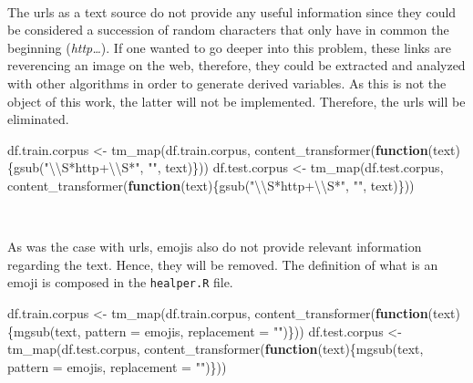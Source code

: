 \documentclass[
]{article}
\newenvironment{Shaded}{\begin{snugshade}}{\end{snugshade}}
\newcommand{\AttributeTok}[1]{\textcolor[rgb]{0.77,0.63,0.00}{#1}}
\newcommand{\ControlFlowTok}[1]{\textcolor[rgb]{0.13,0.29,0.53}{\textbf{#1}}}
\newcommand{\FunctionTok}[1]{\textcolor[rgb]{0.00,0.00,0.00}{#1}}
\newcommand{\NormalTok}[1]{#1}
\newcommand{\OtherTok}[1]{\textcolor[rgb]{0.56,0.35,0.01}{#1}}
\newcommand{\SpecialCharTok}[1]{\textcolor[rgb]{0.00,0.00,0.00}{#1}}
\newcommand{\StringTok}[1]{\textcolor[rgb]{0.31,0.60,0.02}{#1}}
\begin{document}
~

The urls as a text source do not provide any useful information since
they could be considered a succession of random characters that only
have in common the beginning (\emph{http\ldots{}}). If one wanted to go
deeper into this problem, these links are reverencing an image on the
web, therefore, they could be extracted and analyzed with other
algorithms in order to generate derived variables. As this is not the
object of this work, the latter will not be implemented. Therefore, the
urls will be eliminated.

\begin{Shaded}
\begin{Highlighting}[]
\NormalTok{df.train.corpus }\OtherTok{\textless{}{-}} \FunctionTok{tm\_map}\NormalTok{(df.train.corpus, }\FunctionTok{content\_transformer}\NormalTok{(}\ControlFlowTok{function}\NormalTok{(text)\{}\FunctionTok{gsub}\NormalTok{(}\StringTok{"}\SpecialCharTok{\textbackslash{}\textbackslash{}}\StringTok{S*http+}\SpecialCharTok{\textbackslash{}\textbackslash{}}\StringTok{S*"}\NormalTok{, }\StringTok{""}\NormalTok{, text)\}))}
\NormalTok{df.test.corpus }\OtherTok{\textless{}{-}} \FunctionTok{tm\_map}\NormalTok{(df.test.corpus, }\FunctionTok{content\_transformer}\NormalTok{(}\ControlFlowTok{function}\NormalTok{(text)\{}\FunctionTok{gsub}\NormalTok{(}\StringTok{"}\SpecialCharTok{\textbackslash{}\textbackslash{}}\StringTok{S*http+}\SpecialCharTok{\textbackslash{}\textbackslash{}}\StringTok{S*"}\NormalTok{, }\StringTok{""}\NormalTok{, text)\}))}
\end{Highlighting}
\end{Shaded}

~

As was the case with urls, emojis also do not provide relevant
information regarding the text. Hence, they will be removed. The
definition of what is an emoji is composed in the \texttt{healper.R}
file.

\begin{Shaded}
\begin{Highlighting}[]
\NormalTok{df.train.corpus }\OtherTok{\textless{}{-}} \FunctionTok{tm\_map}\NormalTok{(df.train.corpus, }\FunctionTok{content\_transformer}\NormalTok{(}\ControlFlowTok{function}\NormalTok{(text)\{}\FunctionTok{mgsub}\NormalTok{(text, }\AttributeTok{pattern =}\NormalTok{ emojis, }\AttributeTok{replacement =} \StringTok{""}\NormalTok{)\}))}
\NormalTok{df.test.corpus }\OtherTok{\textless{}{-}} \FunctionTok{tm\_map}\NormalTok{(df.test.corpus, }\FunctionTok{content\_transformer}\NormalTok{(}\ControlFlowTok{function}\NormalTok{(text)\{}\FunctionTok{mgsub}\NormalTok{(text, }\AttributeTok{pattern =}\NormalTok{ emojis, }\AttributeTok{replacement =} \StringTok{""}\NormalTok{)\}))}
\end{Highlighting}
\end{Shaded}
\end{document}
